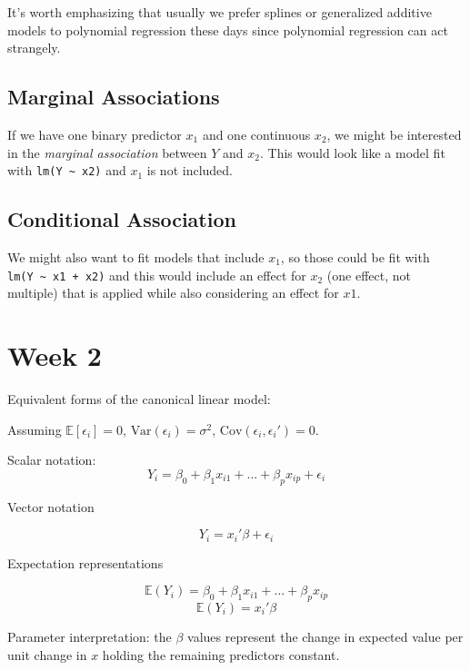 \documentclass[
  letterpaper,
  DIV=11,
  numbers=noendperiod]{scrreport}
\begin{document}
It's worth emphasizing that usually we prefer splines or generalized
additive models to polynomial regression these days since polynomial
regression can act strangely.

\hypertarget{marginal-associations}{%
\section{Marginal Associations}\label{marginal-associations}}

If we have one binary predictor \(x_1\) and one continuous \(x_2\), we
might be interested in the \emph{marginal association} between \(Y\) and
\(x_2\). This would look like a model fit with
\texttt{lm(Y\ \textasciitilde{}\ x2)} and \(x_1\) is not included.

\hypertarget{conditional-association}{%
\section{Conditional Association}\label{conditional-association}}

We might also want to fit models that include \(x_1\), so those could be
fit with \texttt{lm(Y\ \textasciitilde{}\ x1\ +\ x2)} and this would
include an effect for \(x_2\) (one effect, not multiple) that is applied
while also considering an effect for \(x1\).


\hypertarget{week-2}{%
\chapter{Week 2}\label{week-2}}

Equivalent forms of the canonical linear model:

Assuming \(\mathbb E[\epsilon_i] = 0\),
\(\text{Var}(\epsilon_i) = \sigma^2\),
\(\text{Cov}(\epsilon_i, \epsilon_i') = 0\).

Scalar notation:
\[ Y_i = \beta_0 + \beta_1 x_{i1} + ... + \beta_p x_{ip} + \epsilon_i\]

Vector notation

\[ Y_i = x_i' \beta + \epsilon_i\]

Expectation representations

\[\mathbb E(Y_i) = \beta_0 + \beta_1 x_{i1} + ... + \beta_p x_{ip}\]
\[\mathbb E(Y_i) = x_i' \beta\]

Parameter interpretation: the \(\beta\) values represent the change in
expected value per unit change in \(x\) holding the remaining predictors
constant.
\end{document}
